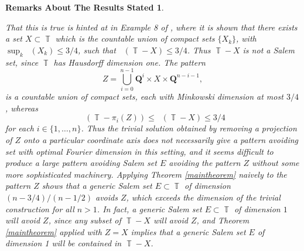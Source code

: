 \documentclass[dvipsnames,letterpaper,12pt]{article}
\numberwithin{equation}{section}
\DeclareMathOperator{\minkdim}{\dim_{\mathbb{M}}}
\DeclareMathOperator{\fordim}{\dim_{\mathbb{F}}}
\DeclareMathOperator{\TT}{\mathbb{T}}
\newtheorem*{remarksaboutresults}{Remarks About The Results Stated}
\numberwithin{theorem}{section}
\begin{document}
\begin{remarksaboutresults}
\begin{enumerate}
        That this is true is hinted at in Example 8 of \cite{Ekstrom2014}, where it is shown that there exists a set $X \subset \TT$ which is the countable union of compact sets $\{ X_k \}$, with $\sup_k \minkdim(X_k) \leq 3/4$, such that $\fordim(\TT - X) \leq 3/4$. Thus $\TT - X$ is not a Salem set, since $\TT$ has Hausdorff dimension one. The pattern
        \[ Z = \bigcup_{i = 0}^{n-1} \mathbf{Q}^i \times X \times \mathbf{Q}^{n-i-1}, \]
        is a countable union of compact sets, each with Minkowski dimension at most $3/4$, whereas
        \[ \fordim(\TT - \pi_i(Z)) \leq \fordim(\TT - X) \leq 3/4 \]
        for each $i \in \{ 1, \dots, n \}$. Thus the trivial solution obtained by removing a projection of $Z$ onto a particular coordinate axis does not necessarily give a pattern avoiding set with optimal Fourier dimension in this setting, and it seems difficult to produce a large pattern avoiding Salem set $E$ avoiding the pattern $Z$ without some more sophisticated machinery. Applying Theorem \ref{maintheorem} naively to the pattern $Z$ shows that a generic Salem set $E \subset \TT$ of dimension $(n-3/4)/(n-1/2)$ avoids $Z$, which exceeds the dimension of the trivial construction for all $n > 1$. In fact, a generic Salem set $E \subset \TT$ of dimension $1$ will avoid $Z$, since any subset of $\TT - X$ will avoid $Z$, and Theorem \ref{maintheorem} applied with $Z = X$ implies that a generic Salem set $E$ of dimension 1 will be contained in $\TT - X$.






\end{enumerate}
\end{remarksaboutresults}
\end{document}
